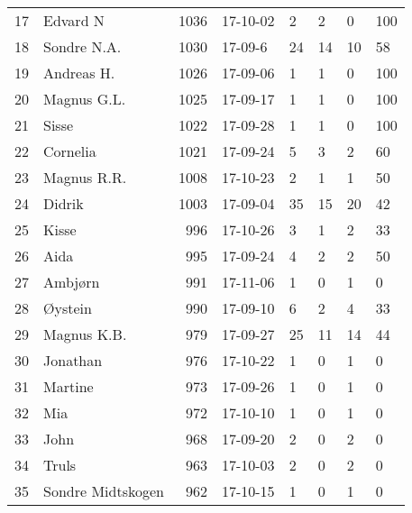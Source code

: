 \begin{longtable}{|r|l|r|l|l|l|l|l|}
17 &             Edvard N &  1036 &    17-10-02 &               2 &     2 &       0 &       100 \\
18 &          Sondre N.A. &  1030 &     17-09-6 &              24 &    14 &      10 &        58 \\
19 &           Andreas H. &  1026 &    17-09-06 &               1 &     1 &       0 &       100 \\
20 &          Magnus G.L. &  1025 &    17-09-17 &               1 &     1 &       0 &       100 \\
21 &                Sisse &  1022 &    17-09-28 &               1 &     1 &       0 &       100 \\
22 &             Cornelia &  1021 &    17-09-24 &               5 &     3 &       2 &        60 \\
23 &          Magnus R.R. &  1008 &    17-10-23 &               2 &     1 &       1 &        50 \\
24 &               Didrik &  1003 &    17-09-04 &              35 &    15 &      20 &        42 \\
25 &                Kisse &   996 &    17-10-26 &               3 &     1 &       2 &        33 \\
26 &                 Aida &   995 &    17-09-24 &               4 &     2 &       2 &        50 \\
27 &              Ambjørn &   991 &    17-11-06 &               1 &     0 &       1 &         0 \\
28 &              Øystein &   990 &    17-09-10 &               6 &     2 &       4 &        33 \\
29 &          Magnus K.B. &   979 &    17-09-27 &              25 &    11 &      14 &        44 \\
30 &             Jonathan &   976 &    17-10-22 &               1 &     0 &       1 &         0 \\
31 &              Martine &   973 &    17-09-26 &               1 &     0 &       1 &         0 \\
32 &                  Mia &   972 &    17-10-10 &               1 &     0 &       1 &         0 \\
33 &                 John &   968 &    17-09-20 &               2 &     0 &       2 &         0 \\
34 &                Truls &   963 &    17-10-03 &               2 &     0 &       2 &         0 \\
35 &    Sondre Midtskogen &   962 &    17-10-15 &               1 &     0 &       1 &         0 \\

\end{longtable}
